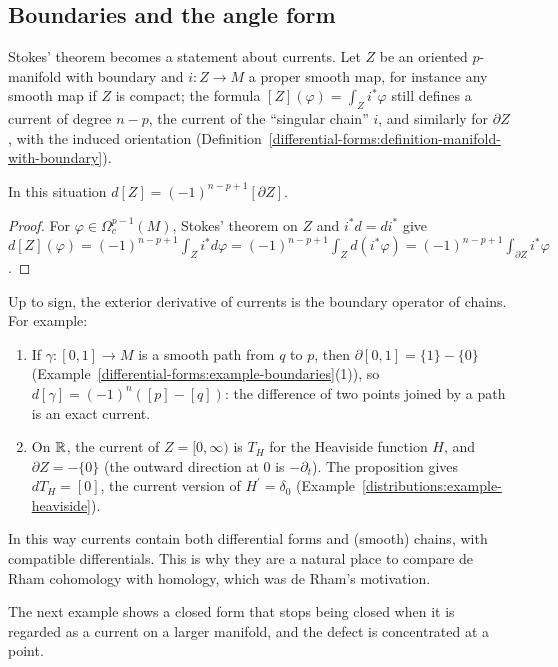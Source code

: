 \subsection{Boundaries and the angle form}\label{de-rham:subsection-currents-boundaries}

Stokes' theorem becomes a statement about currents. Let $Z$ be an oriented $p$-manifold with boundary and $i \colon Z \to M$ a proper smooth map, for instance any smooth map if $Z$ is compact; the formula $[Z](\varphi) = \int_Zi^*\varphi$
still defines a current of degree $n - p$, the current of the ``singular chain'' $i$, and similarly for $\partial Z$, with the induced orientation (Definition~\ref{differential-forms:definition-manifold-with-boundary}).

\begin{proposition}\label{de-rham:proposition-boundary-current}
In this situation $d[Z] = (-1)^{n-p+1}[\partial Z]$.
\end{proposition}

\begin{proof}
For $\varphi \in \Omega^{p-1}_c(M)$, Stokes' theorem on $Z$ and $i^*d = di^*$ give
$d[Z](\varphi) = (-1)^{n-p+1}\int_Zi^*d\varphi = (-1)^{n-p+1}\int_Zd(i^*\varphi) = (-1)^{n-p+1}\int_{\partial Z}i^*\varphi$.
\end{proof}

Up to sign, the exterior derivative of currents is the boundary operator of chains. For example:
\begin{enumerate}
\item If $\gamma \colon [0, 1] \to M$ is a smooth path from $q$ to $p$, then $\partial[0, 1] = \{1\} - \{0\}$ (Example~\ref{differential-forms:example-boundaries}(1)), so
$d[\gamma] = (-1)^n([p] - [q])$: the difference of two points joined by a path is an exact current.
\item On $\mathbb{R}$, the current of $Z = [0, \infty)$ is $T_H$ for the Heaviside function $H$, and $\partial Z = -\{0\}$ (the outward direction at $0$ is $-\partial_t$). The proposition gives
$dT_H = [0]$, the current version of $H^{\prime} = \delta_0$ (Example~\ref{distributions:example-heaviside}).
\end{enumerate}
In this way currents contain both differential forms and (smooth) chains, with compatible differentials. This is why they are a natural place to compare de Rham cohomology with homology, which
was de Rham's motivation.

The next example shows a closed form that stops being closed when it is regarded as a current on a larger manifold, and the defect is concentrated at a point.

